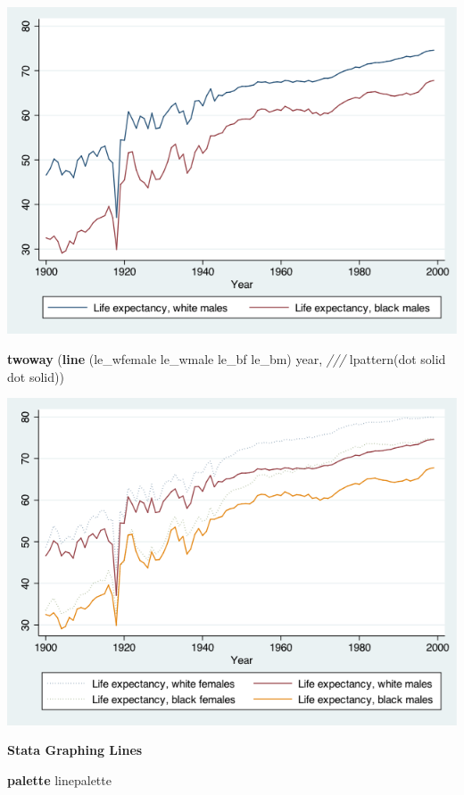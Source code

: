 \documentclass[
]{book}
\newenvironment{Shaded}{\begin{snugshade}}{\end{snugshade}}
\newcommand{\BaseNTok}[1]{\textcolor[rgb]{0.00,0.00,0.81}{#1}}
\newcommand{\CommentTok}[1]{\textcolor[rgb]{0.56,0.35,0.01}{\textit{#1}}}
\newcommand{\FunctionTok}[1]{\textcolor[rgb]{0.00,0.00,0.00}{#1}}
\newcommand{\KeywordTok}[1]{\textcolor[rgb]{0.13,0.29,0.53}{\textbf{#1}}}
\newcommand{\NormalTok}[1]{#1}
\begin{document}
\includegraphics{Stata/StataModGraph/images/lineGraph1.png}

\begin{Shaded}
\begin{Highlighting}[]
  \KeywordTok{twoway}\NormalTok{ (}\KeywordTok{line}\NormalTok{ (le_wfemale le_wmale le_bf le_bm) }\FunctionTok{year}\NormalTok{, }\CommentTok{///}
\NormalTok{      lpattern(}\BaseNTok{dot}\NormalTok{ solid }\BaseNTok{dot}\NormalTok{ solid))}
\end{Highlighting}
\end{Shaded}

\includegraphics{Stata/StataModGraph/images/linegraph2.png}

\textbf{Stata Graphing Lines}

\begin{Shaded}
\begin{Highlighting}[]
  \KeywordTok{palette}\NormalTok{ linepalette}
\end{Highlighting}
\end{Shaded}
\end{document}
